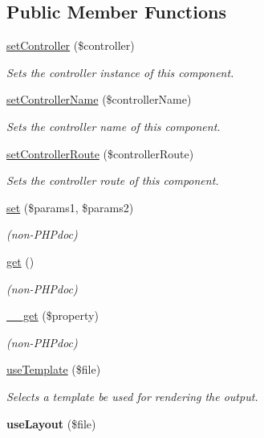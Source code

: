 \subsection*{Public Member Functions}
\begin{DoxyCompactItemize}
\item 
\hyperlink{class_component_a7d45edfee0822893fa01c29ac4fd8651}{setController} (\$controller)
\begin{DoxyCompactList}\small\item\em Sets the controller instance of this component. \item\end{DoxyCompactList}\item 
\hyperlink{class_component_aafe197982a64f3e4ecca262f9b6036eb}{setControllerName} (\$controllerName)
\begin{DoxyCompactList}\small\item\em Sets the controller name of this component. \item\end{DoxyCompactList}\item 
\hyperlink{class_component_a0c3f6f5c8d839724f2f89d4a194c69d6}{setControllerRoute} (\$controllerRoute)
\begin{DoxyCompactList}\small\item\em Sets the controller route of this component. \item\end{DoxyCompactList}\item 
\hyperlink{class_component_ade610325a5659ae078e577c7e214628d}{set} (\$params1, \$params2)
\begin{DoxyCompactList}\small\item\em (non-\/PHPdoc) \item\end{DoxyCompactList}\item 
\hyperlink{class_component_aed7875dbe865616c171efd77ad1996fa}{get} ()
\begin{DoxyCompactList}\small\item\em (non-\/PHPdoc) \item\end{DoxyCompactList}\item 
\hyperlink{class_component_a319d66fdf1928cbab1561374d5780db0}{\_\-\_\-get} (\$property)
\begin{DoxyCompactList}\small\item\em (non-\/PHPdoc) \item\end{DoxyCompactList}\item 
\hyperlink{class_component_a1ad258b60615298690760df9d1300ea4}{useTemplate} (\$file)
\begin{DoxyCompactList}\small\item\em Selects a template be used for rendering the output. \item\end{DoxyCompactList}\item 
\hypertarget{class_component_a1e1811f232191736f55b407e5d1c0336}{
{\bfseries useLayout} (\$file)}
\label{class_component_a1e1811f232191736f55b407e5d1c0336}

\end{DoxyCompactItemize}
